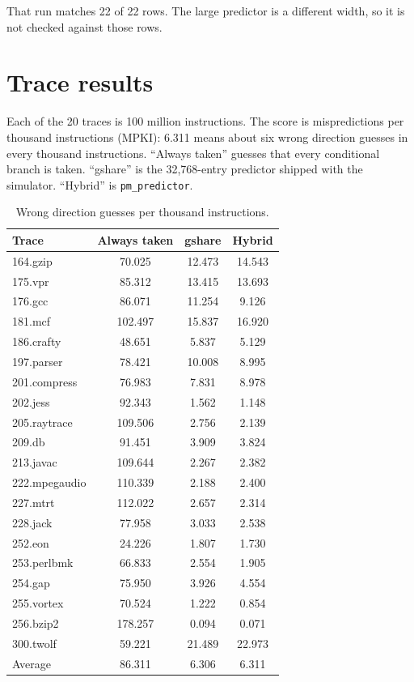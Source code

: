 \documentclass[11pt]{article}
\begin{document}
That run matches 22 of 22 rows. The large predictor is a different width, so
it is not checked against those rows.

\section{Trace results}

Each of the 20 traces is 100 million instructions. The score is
mispredictions per thousand instructions (MPKI): 6.311 means about six
wrong direction guesses in every thousand instructions. ``Always taken''
guesses that every conditional branch is taken. ``gshare'' is the
32,768-entry predictor shipped with the simulator. ``Hybrid'' is
\texttt{pm\_predictor}.

\begin{table}[ht]
\centering
\begin{tabular}{l S[table-format=3.3] S[table-format=2.3] S[table-format=2.3]}
\toprule
{Trace} & {Always taken} & {gshare} & {Hybrid} \\
\midrule
164.gzip      & 70.025 & 12.473 & 14.543 \\
175.vpr       & 85.312 & 13.415 & 13.693 \\
176.gcc       & 86.071 & 11.254 & 9.126 \\
181.mcf       & 102.497 & 15.837 & 16.920 \\
186.crafty    & 48.651 & 5.837 & 5.129 \\
197.parser    & 78.421 & 10.008 & 8.995 \\
201.compress  & 76.983 & 7.831 & 8.978 \\
202.jess      & 92.343 & 1.562 & 1.148 \\
205.raytrace  & 109.506 & 2.756 & 2.139 \\
209.db        & 91.451 & 3.909 & 3.824 \\
213.javac     & 109.644 & 2.267 & 2.382 \\
222.mpegaudio & 110.339 & 2.188 & 2.400 \\
227.mtrt      & 112.022 & 2.657 & 2.314 \\
228.jack      & 77.958 & 3.033 & 2.538 \\
252.eon       & 24.226 & 1.807 & 1.730 \\
253.perlbmk   & 66.833 & 2.554 & 1.905 \\
254.gap       & 75.950 & 3.926 & 4.554 \\
255.vortex    & 70.524 & 1.222 & 0.854 \\
256.bzip2     & 178.257 & 0.094 & 0.071 \\
300.twolf     & 59.221 & 21.489 & 22.973 \\
\midrule
{Average}     & 86.311 & 6.306 & 6.311 \\
\bottomrule
\end{tabular}
\caption{Wrong direction guesses per thousand instructions.}
\end{table}
\end{document}
